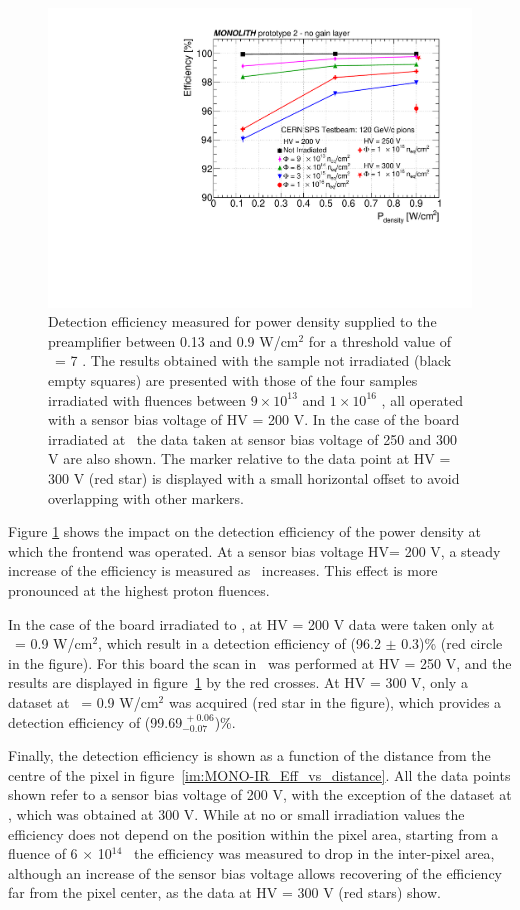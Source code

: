 		\begin{figure}[h]
			\centering
			\includegraphics[width=.75\textwidth]{files/MONOLITH_Irradiated_paper/Power_efficiency}
			\caption{Detection efficiency measured for power density supplied to the preamplifier   between 0.13 and 0.9 W/cm$^2$ for a threshold value of \vth~= 7 \noise. The results obtained with the sample  not irradiated  (black empty squares) are presented with those of the four samples irradiated with fluences between $9 \times 10^{13}$ \flu  and $1 \times 10^{16}$ \flu, all operated with a sensor bias voltage of HV = 200 V. In the case of the board irradiated at \maxflu~the data taken at sensor bias voltage of 250 and 300 V are also shown. The marker relative to the data point at HV = 300 V (red star) is displayed with a small horizontal offset to avoid  overlapping with other markers.}
			\label{im:MONO-IR_Power_vs_eff}
		\end{figure}

		Figure \ref{im:MONO-IR_Power_vs_eff} shows the impact on the detection efficiency of the power density at which the frontend was operated. 
		At a sensor bias voltage HV= 200 V, a steady increase of the efficiency is measured as \power~increases. This effect is more pronounced at the highest proton fluences. 

		In the case of the board irradiated to \maxflu, at HV = 200 V data were taken only at \power~= 0.9 W/cm$^2$, which result in a detection efficiency of (96.2 $\pm$ 0.3)\% (red circle in the figure).
		For this board the scan in \power~was performed at HV = 250 V, and the results are displayed in figure~\ref{im:MONO-IR_Power_vs_eff} by the red crosses. 
		At HV = 300 V, only a dataset at \power~= 0.9 W/cm$^2$ was acquired  (red star in the figure), which provides a detection efficiency of (99.69$^{~\!+0.06}_{-0.07}$)\%.

		Finally, the detection efficiency is shown as a function of the distance from the centre of the pixel in figure~\ref{im:MONO-IR_Eff_vs_distance}.
		All the data points shown refer to a sensor bias voltage of 200 V, with the exception of the dataset at \maxflu, which was obtained at 300 V.
		While at no or small irradiation values the efficiency does not depend on the position within the pixel area, starting from a fluence of 6 $\times$ 10$^{14}$ \flu~the efficiency was measured to drop in the inter-pixel area, although an increase of the sensor bias voltage allows recovering of the efficiency far from the pixel center, as the data at HV = 300 V (red stars) show.

